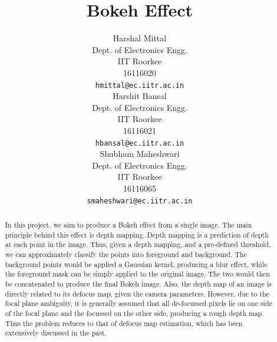 \documentclass[letterpaper, 10 pt, conference]{ieeeconf}  %
\title{\LARGE \bf
Bokeh Effect   
}
\author{ \parbox{2 in}{\centering  Harshal Mittal\\
    Dept. of Electronics Engg.\\
    IIT Roorkee\\    
   16116020 \\
        {\tt\small hmittal@ec.iitr.ac.in}}
        \hspace*{ 0.5 in}
        \parbox{2 in}{\centering Harshit Bansal\\
        Dept. of Electronics Engg.\\
    IIT Roorkee\\    
   16116021 \\
        {\tt\small hbansal@ec.iitr.ac.in}}
        \hspace*{ 0.5 in}
        \parbox{2 in}{\centering Shubham Maheshwari \\
        Dept. of Electronics Engg.\\
     IIT Roorkee\\    
16116065\\
        {\tt\small smaheshwari@ec.iitr.ac.in}
        \hspace*{ 0.5 in}}
}
\begin{document}
\maketitle
\thispagestyle{empty}
\pagestyle{empty}





\begin{abstract}

In this project, we aim to produce a Bokeh effect from a single image. The main principle behind this effect is depth mapping. Depth mapping is a prediction of depth at each point in the image. Thus, given a depth mapping, and a pre-defined threshold, we can approximately classify the points into foreground and background. The background points would be applied a Gaussian kernel, producing a blur effect, while the foreground mask can be simply applied to the original image. The two would then be concatenated to produce the final Bokeh image. Also, the depth map of an image is directly related to its defocus map, given the camera parameters. However, due to the focal plane ambiguity, it is generally assumed that all de-focussed pixels lie on one side of the focal plane and the focussed on the other side, producing a rough depth map. Thus the problem reduces to that of defocus map estimation, which has been extensively discussed in the past.

\end{abstract}


\end{document}
